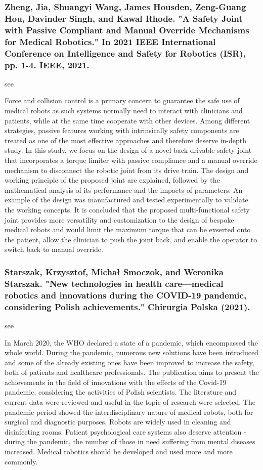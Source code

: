 \documentclass[conference]{IEEEtran}
\begin{document}
\medskip
\subsubsection{Zheng, Jia, Shuangyi Wang, James Housden, Zeng-Guang Hou, Davinder Singh, and Kawal Rhode. "A Safety Joint with Passive Compliant and Manual Override Mechanisms for Medical Robotics." In 2021 IEEE International Conference on Intelligence and Safety for Robotics (ISR), pp. 1-4. IEEE, 2021.}
see \cite{zheng2021safety}

Force and collision control is a primary concern to guarantee the safe use of medical robots as such systems normally need to interact with clinicians and patients, while at the same time cooperate with other devices. Among different strategies, passive features working with intrinsically safety components are treated as one of the most effective approaches and therefore deserve in-depth study. In this study, we focus on the design of a novel back-drivable safety joint that incorporates a torque limiter with passive compliance and a manual override mechanism to disconnect the robotic joint from its drive train. The design and working principle of the proposed joint are explained, followed by the mathematical analysis of its performance and the impacts of parameters. An example of the design was manufactured and tested experimentally to validate the working concepts. It is concluded that the proposed multi-functional safety joint provides more versatility and customization to the design of bespoke medical robots and would limit the maximum torque that can be exserted onto the patient, allow the clinician to push the joint back, and enable the operator to switch back to manual override.


\medskip
\subsubsection{Starszak, Krzysztof, Michał Smoczok, and Weronika Starszak. "New technologies in health care—medical robotics and innovations during the COVID-19 pandemic, considering Polish achievements." Chirurgia Polska (2021).}
see \cite{starszak2021new}

In March 2020, the WHO declared a state of a pandemic, which encompassed the whole world. During
the pandemic, numerous new solutions have been introduced and some of the already existing ones
have been improved to increase the safety, both of patients and healthcare professionals. The publication
aims to present the achievements in the field of innovations with the effects of the Covid-19 pandemic,
considering the activities of Polish scientists. The literature and current data were reviewed and useful in
the topic of research were selected. The pandemic period showed the interdisciplinary nature of medical
robots, both for surgical and diagnostic purposes. Robots are widely used in cleaning and disinfecting
rooms. Patient psychological care systems also deserve attention - during the pandemic, the number of
those in need suffering from mental diseases increased. Medical robotics should be developed and used
more and more commonly.
\end{document}
